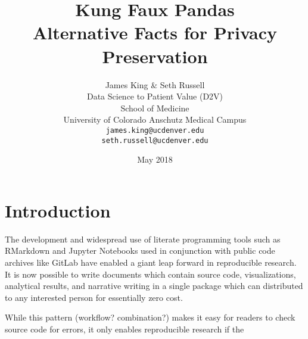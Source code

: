 \documentclass{article}
\title{%
  Kung Faux Pandas \\
  \large Alternative Facts for 
    Privacy Preservation}
\author{
  James King \& Seth Russell\\
  Data Science to Patient Value (D2V)\\
  School of Medicine \\
  University of Colorado Anschutz Medical Campus\\
  \texttt{james.king@ucdenver.edu} \\ 
  \texttt{seth.russell@ucdenver.edu} \\
  }
\date{May 2018}
\begin{document}


\maketitle

\begin{abstract}

\end{abstract}

\section{Introduction}

The development and widespread use of literate programming tools such as RMarkdown and Jupyter Notebooks used in conjunction with public code archives like GitLab have enabled a giant leap forward in reproducible research.  It is now possible to write documents which contain source code, visualizations, analytical results, and narrative writing in a single package which can distributed to any interested person for essentially zero cost.

While this pattern (workflow? combination?) makes it easy for readers to check source code for errors, it only enables reproducible research if the 




\end{document}
